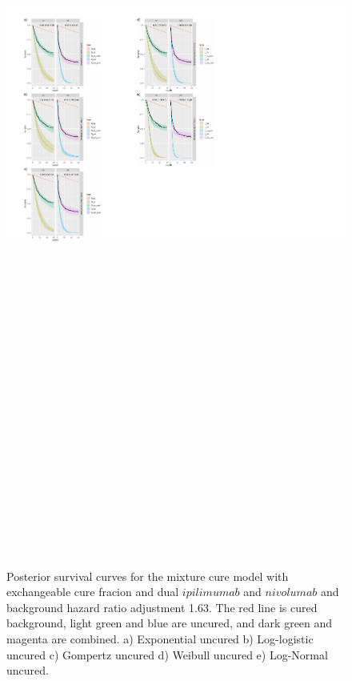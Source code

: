 \documentclass[
]{article}
\begin{document}
\begin{figure}

{\centering \includegraphics[width=25cm,height=40cm]{Check_mate_analysis_files/figure-latex/unnamed-chunk-11-1} 

}

\caption{\label{fig:NIVO+IPI_163}Posterior survival curves for the mixture cure model with exchangeable cure fracion and dual $ipilimumab$ and $nivolumab$ and background hazard ratio adjustment 1.63. The red line is cured background, light green and blue are uncured, and dark green and magenta are combined. a) Exponential uncured b) Log-logistic uncured c) Gompertz uncured d) Weibull uncured e) Log-Normal uncured.}\label{fig:unnamed-chunk-11}
\end{figure}
\end{document}

